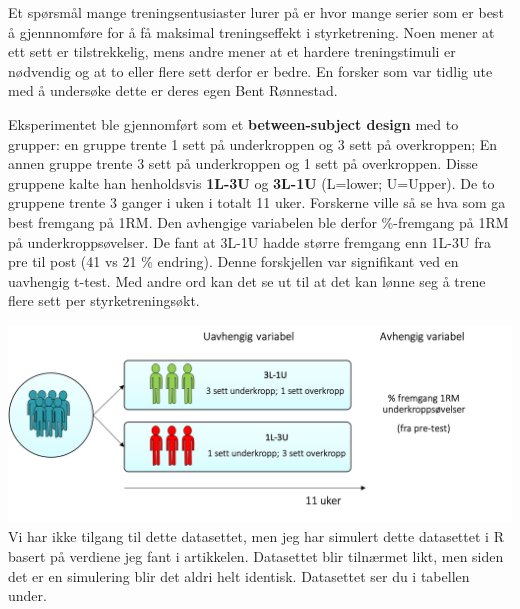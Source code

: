 \documentclass[
]{book}
\begin{document}
Et spørsmål mange treningsentusiaster lurer på er hvor mange serier som er best å gjennnomføre for å få maksimal treningseffekt i styrketrening. Noen mener at ett sett er tilstrekkelig, mens andre mener at et hardere treningstimuli er nødvendig og at to eller flere sett derfor er bedre. En forsker som var tidlig ute med å undersøke dette er deres egen Bent Rønnestad.

Eksperimentet ble gjennomført som et \textbf{between-subject design} med to grupper: en gruppe trente 1 sett på underkroppen og 3 sett på overkroppen; En annen gruppe trente 3 sett på underkroppen og 1 sett på overkroppen. Disse gruppene kalte han henholdsvis \textbf{1L-3U} og \textbf{3L-1U} (L=lower; U=Upper). De to gruppene trente 3 ganger i uken i totalt 11 uker. Forskerne ville så se hva som ga best fremgang på 1RM. Den avhengige variabelen ble derfor \%-fremgang på 1RM på underkroppsøvelser. De fant at 3L-1U hadde større fremgang enn 1L-3U fra pre til post (41 vs 21 \% endring). Denne forskjellen var signifikant ved en uavhengig t-test. Med andre ord kan det se ut til at det kan lønne seg å trene flere sett per styrketreningsøkt.

\includegraphics{design.png}
Vi har ikke tilgang til dette datasettet, men jeg har simulert dette datasettet i R basert på verdiene jeg fant i artikkelen. Datasettet blir tilnærmet likt, men siden det er en simulering blir det aldri helt identisk. Datasettet ser du i tabellen under.
\end{document}
